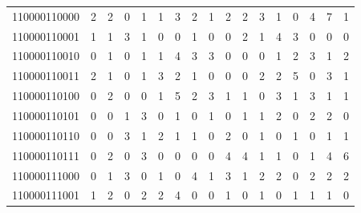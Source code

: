 \documentclass[10pt,a4paper]{article}
\begin{document}
\begin{longtable}{ |c|c|c|c|c|c|c|c|c|c|c|c|c|c|c|c|c| }
    110000110000              & 2                            & 2                                & 0                            & 1                              & 1   & 3   & 2   & 1   & 2   & 2   & 3   & 1   & 0   & 4   & 7   & 1   \\
    110000110001              & 1                            & 1                                & 3                            & 1                              & 0   & 0   & 1   & 0   & 0   & 2   & 1   & 4   & 3   & 0   & 0   & 0   \\
    110000110010              & 0                            & 1                                & 0                            & 1                              & 1   & 4   & 3   & 3   & 0   & 0   & 0   & 1   & 2   & 3   & 1   & 2   \\
    110000110011              & 2                            & 1                                & 0                            & 1                              & 3   & 2   & 1   & 0   & 0   & 0   & 2   & 2   & 5   & 0   & 3   & 1   \\
    110000110100              & 0                            & 2                                & 0                            & 0                              & 1   & 5   & 2   & 3   & 1   & 1   & 0   & 3   & 1   & 3   & 1   & 1   \\
    110000110101              & 0                            & 0                                & 1                            & 3                              & 0   & 1   & 0   & 1   & 0   & 1   & 1   & 2   & 0   & 2   & 2   & 0   \\
    110000110110              & 0                            & 0                                & 3                            & 1                              & 2   & 1   & 1   & 0   & 2   & 0   & 1   & 0   & 1   & 0   & 1   & 1   \\
    110000110111              & 0                            & 2                                & 0                            & 3                              & 0   & 0   & 0   & 0   & 4   & 4   & 1   & 1   & 0   & 1   & 4   & 6   \\
    110000111000              & 0                            & 1                                & 3                            & 0                              & 1   & 0   & 4   & 1   & 3   & 1   & 2   & 2   & 0   & 2   & 2   & 2   \\
    110000111001              & 1                            & 2                                & 0                            & 2                              & 2   & 4   & 0   & 0   & 1   & 0   & 1   & 0   & 1   & 1   & 1   & 0   \\

\end{longtable}
\end{document}
